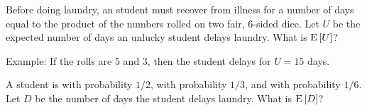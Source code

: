 \documentclass[12pt,twoside]{article}
\begin{document}
\begin{problem}{20}
 Before doing laundry, an  student must recover
from illness for a number of days equal to the product of the numbers
rolled on two fair, 6-sided dice.  Let $U$ be the expected number of
days an unlucky student delays laundry.  What is $\mathop{\textup{E}}\nolimits\left[U\right]$?

Example: If the rolls are 5 and 3, then the student delays for $U =
15$ days.


 A student is  with probability $1/2$, 
with probability $1/3$, and  with probability $1/6$.
Let $D$ be the number of days the student delays laundry.  What is
$\mathop{\textup{E}}\nolimits\left[D\right]$?

\solution{
\[
\expect{D} = \frac{1}{2} \expect{B} + \frac{1}{3} \expect{R} + \frac{1}{6} \expect{U}
\]
}

\eparts

\end{problem}
\end{document}
